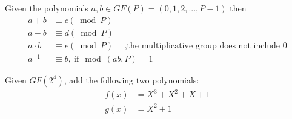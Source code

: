 \begin{rem} Given the polynomials $a,b \in  GF(P) = (0,1,2,...,P-1)$ then 
\begin{align*} 		
		a + b &\equiv c (\bmod P)\\
		a - b &\equiv d (\bmod P)\\
		a \cdot b &\equiv e (\bmod P) \quad \text{ ,the multiplicative group does not include 0}\\
		a^{-1} &\equiv b, \mathrm{~if~} \bmod (ab, P) = 1
\end{align*}
\end{rem}	
\begin{exer} Given $GF(2^4)$, add the following two polynomials:
\begin{align*}
	f(x) &= X^3 + X^2 + X + 1\\
	g(x) &= X^2  + 1
 \end{align*}
\end{exer}

